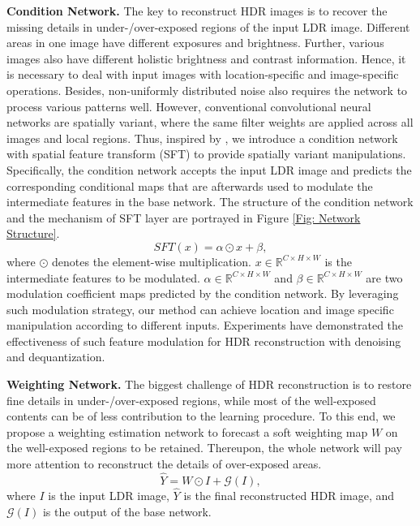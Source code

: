 \documentclass[final]{cvpr}
\begin{document}
\textbf{Condition Network.} The key to reconstruct HDR images is to recover the missing details in under-/over-exposed regions of the input LDR image. Different areas in one image have different exposures and brightness. Further, various images also have different holistic brightness and contrast information. Hence, it is necessary to deal with input images with location-specific and image-specific operations. Besides, non-uniformly distributed noise also requires the network to process various patterns well. However, conventional convolutional neural networks are spatially variant, where the same filter weights are applied across all images and local regions. Thus, inspired by \cite{wang2018recovering, liu2021very}, we introduce a condition network with spatial feature transform (SFT) \cite{wang2018recovering} to provide spatially variant manipulations. Specifically, the condition network accepts the input LDR image and predicts the corresponding conditional maps that are afterwards used to modulate the intermediate features in the base network. The structure of the condition network and the mechanism of SFT layer are portrayed in Figure \ref{Fig: Network Structure}.
\begin{equation}
SFT(x) = \alpha \odot x + \beta,
\end{equation}
where $\odot$ denotes the element-wise multiplication. $x \in\mathbb{R}^{C \times H \times W} $ is the intermediate features to be modulated. $\alpha \in\mathbb{R}^{C \times H \times W}$ and $\beta \in\mathbb{R}^{C \times H \times W}$ are two modulation coefficient maps predicted by the condition network. By leveraging such modulation strategy, our method can achieve location and image specific manipulation according to different inputs. Experiments have demonstrated the effectiveness of such feature modulation for HDR reconstruction with denoising and dequantization.

\textbf{Weighting Network.} The biggest challenge of HDR reconstruction is to restore fine details in under-/over-exposed regions, while most of the well-exposed contents can be of less contribution to the learning procedure. To this end, we propose a weighting estimation network to forecast a soft weighting map $W$ on the well-exposed regions to be retained. Thereupon, the whole network will pay more attention to reconstruct the details of over-exposed areas.
\begin{equation}
\hat{Y} = W \odot I + \mathcal{G}(I),
\end{equation}
where $I$ is the input LDR image, $\hat{Y}$ is the final reconstructed HDR image, and $\mathcal{G}(I)$ is the output of the base network.
\end{document}
